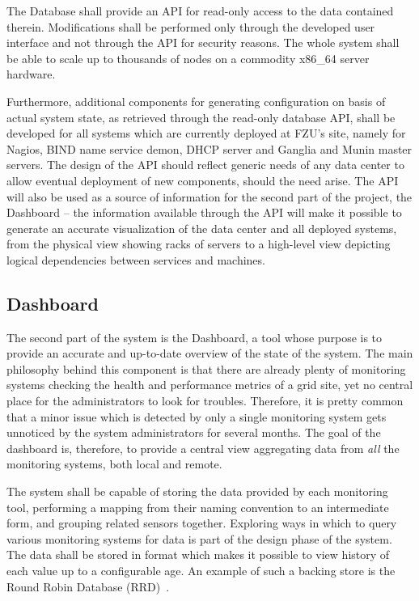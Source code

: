 \documentclass{article}
\begin{document}
The Database shall provide an API for read-only access to the data contained therein.  Modifications shall be performed only
through the developed user interface and not through the API for security reasons.  The whole system shall be able to scale up to
thousands of nodes on a commodity x86\_64 server hardware.

Furthermore, additional components for generating configuration on basis of actual system state, as retrieved through the
read-only database API, shall be developed for all systems which are currently deployed at FZU's site, namely for Nagios, BIND
name service demon, DHCP server and Ganglia and Munin master servers.  The design of the API should reflect generic needs of any
data center to allow eventual deployment of new components, should the need arise.  The API will also be used as a source of
information for the second part of the project, the Dashboard -- the information available through the API will make it possible
to generate an accurate visualization of the data center and all deployed systems, from the physical view showing racks of servers
to a high-level view depicting logical dependencies between services and machines.


\subsection{Dashboard}

The second part of the system is the Dashboard, a tool whose purpose is to provide an accurate and up-to-date overview of the
state of the system.  The main philosophy behind this component is that there are already plenty of monitoring systems checking
the health and performance metrics of a grid site, yet no central place for the administrators to look for troubles.  Therefore,
it is pretty common that a minor issue which is detected by only a single monitoring system gets unnoticed by the system
administrators for several months.  The goal of the dashboard is, therefore, to provide a central view aggregating data from {\em
all} the monitoring systems, both local and remote.

The system shall be capable of storing the data provided by each monitoring tool, performing a mapping from their naming
convention to an intermediate form, and grouping related sensors together.  Exploring ways in which to query various monitoring
systems for data is part of the design phase of the system.  The data shall be stored in format which makes it possible to view
history of each value up to a configurable age.  An example of such a backing store is the Round Robin Database (RRD)~\cite{rrd}.
\end{document}
